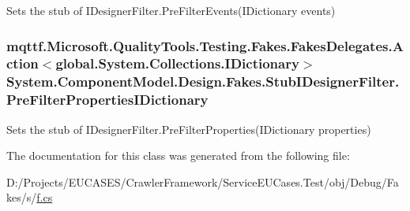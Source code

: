 Sets the stub of I\-Designer\-Filter.\-Pre\-Filter\-Events(\-I\-Dictionary events)

\hypertarget{class_system_1_1_component_model_1_1_design_1_1_fakes_1_1_stub_i_designer_filter_abdcb720a38297badf3feb98cc0b958aa}{
\subsubsection[{Pre\-Filter\-Properties\-I\-Dictionary}]{\setlength{\rightskip}{0pt plus 5cm}mqttf.\-Microsoft.\-Quality\-Tools.\-Testing.\-Fakes.\-Fakes\-Delegates.\-Action$<$global.\-System.\-Collections.\-I\-Dictionary$>$ System.\-Component\-Model.\-Design.\-Fakes.\-Stub\-I\-Designer\-Filter.\-Pre\-Filter\-Properties\-I\-Dictionary}}\label{class_system_1_1_component_model_1_1_design_1_1_fakes_1_1_stub_i_designer_filter_abdcb720a38297badf3feb98cc0b958aa}


Sets the stub of I\-Designer\-Filter.\-Pre\-Filter\-Properties(\-I\-Dictionary properties)



The documentation for this class was generated from the following file\-:\begin{DoxyCompactItemize}
\item 
D\-:/\-Projects/\-E\-U\-C\-A\-S\-E\-S/\-Crawler\-Framework/\-Service\-E\-U\-Cases.\-Test/obj/\-Debug/\-Fakes/s/\hyperlink{s_2f_8cs}{f.\-cs}\end{DoxyCompactItemize}
